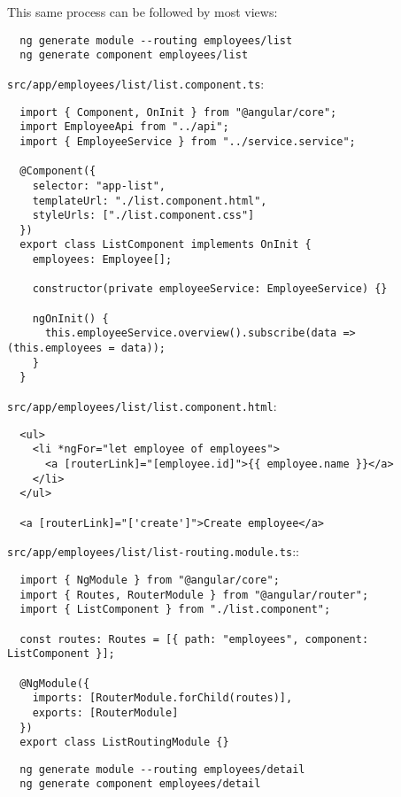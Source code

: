 This same process can be followed by most views:
\begin{verbatim}
  ng generate module --routing employees/list
  ng generate component employees/list
\end{verbatim}

\texttt{src/app/employees/list/list.component.ts}:
\begin{verbatim}
  import { Component, OnInit } from "@angular/core";
  import EmployeeApi from "../api";
  import { EmployeeService } from "../service.service";

  @Component({
    selector: "app-list",
    templateUrl: "./list.component.html",
    styleUrls: ["./list.component.css"]
  })
  export class ListComponent implements OnInit {
    employees: Employee[];

    constructor(private employeeService: EmployeeService) {}

    ngOnInit() {
      this.employeeService.overview().subscribe(data => (this.employees = data));
    }
  }
\end{verbatim}

\texttt{src/app/employees/list/list.component.html}:
\begin{verbatim}
  <ul>
    <li *ngFor="let employee of employees">
      <a [routerLink]="[employee.id]">{{ employee.name }}</a>
    </li>
  </ul>

  <a [routerLink]="['create']">Create employee</a>
\end{verbatim}

\texttt{src/app/employees/list/list-routing.module.ts}::
\begin{verbatim}
  import { NgModule } from "@angular/core";
  import { Routes, RouterModule } from "@angular/router";
  import { ListComponent } from "./list.component";

  const routes: Routes = [{ path: "employees", component: ListComponent }];

  @NgModule({
    imports: [RouterModule.forChild(routes)],
    exports: [RouterModule]
  })
  export class ListRoutingModule {}
\end{verbatim}

\begin{verbatim}
  ng generate module --routing employees/detail
  ng generate component employees/detail
\end{verbatim}

